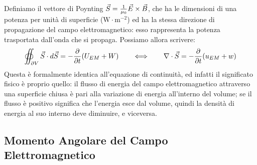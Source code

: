 \documentclass[]{article}
\begin{document}
Definiamo il vettore di Poynting $ \vec{S} = \frac{1}{\mu_0}\vec{E}\times\vec{B} $, che ha le dimensioni di una potenza per unità di superficie ($ \text{W}\cdot\text{m}^{-2} $) ed ha la stessa direzione di propagazione del campo elettromagnetico: esso rappresenta la potenza trasportata dall'onda che si propaga. Possiamo allora scrivere:
\begin{equation}
	\oiint_{\partial V} \vec{S}\cdot d\vec{S} = -\frac{\partial}{\partial t}(U_{EM} + W) \qquad\Longleftrightarrow\qquad \nabla\cdot\vec{S} = -\frac{\partial}{\partial t} (u_{EM} + w)
	\label{eq:34}
\end{equation}
Questa è formalmente identica all'equazione di continuità, ed infatti il significato fisico è proprio quello: il flusso di energia del campo elettromagnetico attraverso una superficie chiusa è pari alla variazione di energia all'interno del volume; se il flusso è positivo significa che l'energia esce dal volume, quindi la densità di energia al suo interno deve diminuire, e viceversa.

\subsection{Momento Angolare del Campo Elettromagnetico}
\end{document}
